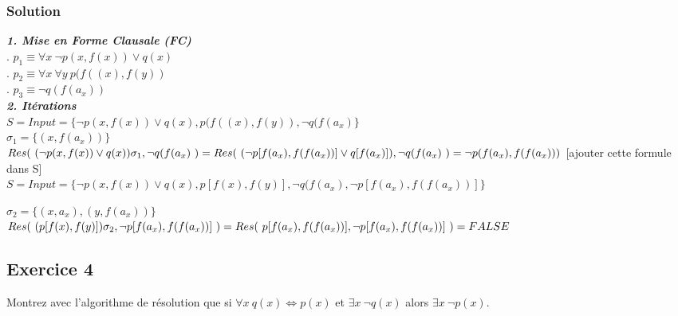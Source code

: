     \subsubsection*{Solution}
    
    \textbf{\textit{ 1. Mise en Forme Clausale (FC)}} \\
    . $p_1 \equiv \forall x \ \neg p(x, f(x)) \lor q(x) $\\
    . $p_2 \equiv \forall x \ \forall y \ p(f((x), f(y)) $\\
    . $p_3 \equiv \neg q(f(a_x))$ \\
    
    \textbf{\textit{2. Itérations }} \\
    $ S = Input = \{ \neg p(x, f(x)) \lor q(x), p(f((x), f(y)), \neg q(f(a_x) \} $ \\
    $ \sigma_1 = \{ (x, f(a_x)) \} $ \\
    $ Res( \ ( \neg p(x, f(x)) \lor q(x))\sigma_1, \neg q(f(a_x) \ ) = Res( \ ( \neg p[f(a_x), f(f(a_x))] \lor q[f(a_x)] ), \neg q(f(a_x)  \ ) \\ = \neg p(f(a_x), f(f(a_x))) $  [ajouter cette formule dans S] \\
    $ S = Input = \{ \neg p(x, f(x)) \lor q(x), p[f(x), f(y)], \neg q(f(a_x), \neg p[f(a_x), f(f(a_x))] \} $
     
    \noindent $ \sigma_{2} = \{ (x,a_x), (y,f(a_x) ) \}$\\
    $ Res( \ (p[f(x), f(y)])\sigma_2, \neg p[f(a_x), f(f(a_x))] \ ) \\ = Res( \ p[f(a_x), f(f(a_x))], \neg p[f(a_x), f(f(a_x))] \ ) = FALSE $\\ 
    


\subsection*{Exercice 4}
Montrez avec l'algorithme de r\'{e}solution que si $\forall x \ q(x) \Leftrightarrow p(x)$ et $\exists x \ \neg q(x)$ alors $\exists x \ \neg p(x)$.

